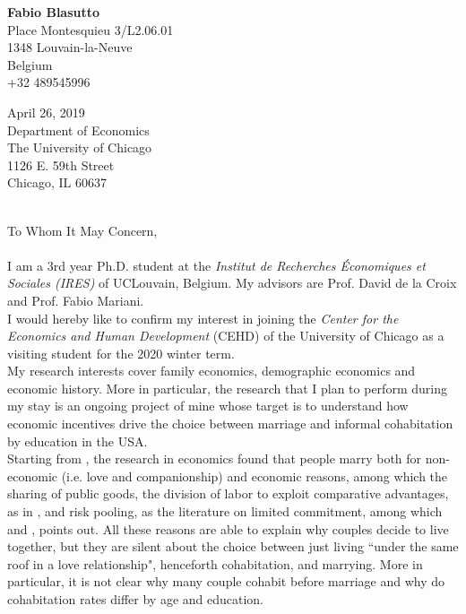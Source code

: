\documentclass[12pt]{article}
\begin{document}

\parskip3mm\parindent0cm
  {\parbox{\textwidth}{\raggedleft \textbf{Fabio Blasutto}\\ %
 Place Montesquieu 3/L2.06.01\\ %
 1348 Louvain-la-Neuve\\ %
 Belgium \\+32 489545996\\\vspace{0.2cm}}
  {\parbox{1.5\textwidth}{\raggedright April 26, 2019\\
  Department of Economics\\
The University of Chicago\\
1126 E. 59th Street\\
Chicago, IL 60637}}
\vspace{0.5cm}\\
To Whom It May Concern,\\
\vspace{0.5cm}\\
I am a 3rd year Ph.D. student at the \textit{Institut de Recherches \'Economiques et Sociales (IRES)} of UCLouvain, Belgium. My advisors are Prof. David de la Croix and Prof. Fabio Mariani.\vspace{0.3cm}\\
I would hereby like to confirm my interest in joining the \textit{Center for the Economics and Human Development} (CEHD) of the University of Chicago as a visiting student for the 2020 winter term.\vspace{0.3cm}\\
My research interests cover family economics, demographic economics and economic history. More in particular, the research that I plan to perform during my stay is an ongoing project of mine whose target is to understand how economic incentives drive the choice between marriage and informal cohabitation by education in the USA.\vspace{0.3cm}\\

Starting from \citet{becker1981}, the research in economics found that people marry both for non-economic (i.e. love and companionship) and economic reasons, among which the sharing of public goods, the division of labor to exploit comparative advantages, as in \citet{chiappori1997}, and risk pooling, as the literature on limited commitment, among which \citet{voena2015} and \citet{rigas2015}, points out. All these reasons are able to explain why couples decide to live together, but they are silent about the choice between just living ``under the same roof in a love relationship", henceforth cohabitation, and marrying. More in particular, it is not clear why many couple cohabit before marriage and why do cohabitation rates differ by age and education.


}
\end{document}
